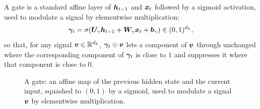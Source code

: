 \begin{definition}[Gate]
A gate is a standard affine layer of $\bm{h}_{t-1}$ and $\bm{x}_t$ followed by a sigmoid activation, used to modulate a signal by elementwise multiplication:
\begin{equation}
\bm{\gamma}_t = \sigma(\bm{U}_\gamma \bm{h}_{t-1} + \bm{W}_\gamma \bm{x}_t + \bm{b}_\gamma) \in (0,1)^{d_h},
\end{equation}
so that, for any signal $\bm{v} \in \mathbb{R}^{d_h}$, $\bm{\gamma}_t \odot \bm{v}$ lets a component of $\bm{v}$ through unchanged where the corresponding component of $\bm{\gamma}_t$ is close to $1$ and suppresses it where that component is close to $0$.
\end{definition}

\begin{figure}[htbp]
\centering
{}
\caption[A LSTM gate]{A gate: an affine map of the previous hidden state and the current input, squashed to $(0,1)$ by a sigmoid, used to modulate a signal $\bm{v}$ by elementwise multiplication.}
\label{fig:lstm-gate}
\end{figure}


